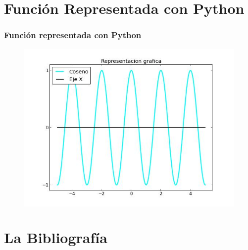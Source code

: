 \documentclass{beamer}
\begin{document}
\section{Función Representada con Python}
\begin{frame}
\frametitle{Función representada con Python}

\begin{figure}[b]
\begin{center}
\includegraphics[scale=0.5]{cos.jpeg}
\end{center}
\end{figure}
\end{frame}

\section{La Bibliografía}
\end{document}
